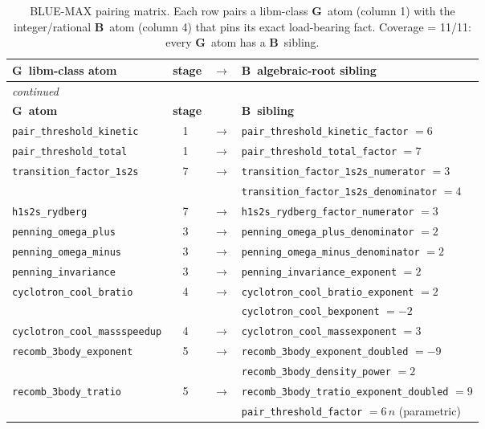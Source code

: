 \documentclass[11pt,a4paper]{article}
\newcommand{\tierBlue}{\textbf{B}}
\newcommand{\tierGreen}{\textbf{G}}
\newcommand{\stg}[1]{\textcircled{\scriptsize#1}}
\begin{document}
\begin{longtable}{@{}l c c l@{}}
\caption{BLUE-MAX pairing matrix. Each row pairs a libm-class
\tierGreen\ atom (column 1) with the integer/rational \tierBlue\ atom
(column 4) that pins its exact load-bearing fact. Coverage = 11/11:
every \tierGreen\ atom has a \tierBlue\ sibling.}
\label{tab:matrix}\\
\toprule
\textbf{\tierGreen\ libm-class atom} & \textbf{stage} & $\to$ &
\textbf{\tierBlue\ algebraic-root sibling} \\
\midrule
\endfirsthead
\multicolumn{4}{l}{\small\itshape continued}\\
\toprule
\textbf{\tierGreen\ atom} & \textbf{stage} & & \textbf{\tierBlue\ sibling} \\
\midrule
\endhead
\texttt{pair\_threshold\_kinetic}     & \stg{1} & $\to$ & \texttt{pair\_threshold\_kinetic\_factor} $=6$ \\
\texttt{pair\_threshold\_total}       & \stg{1} & $\to$ & \texttt{pair\_threshold\_total\_factor} $=7$ \\
\texttt{transition\_factor\_1s2s}     & \stg{7} & $\to$ & \texttt{transition\_factor\_1s2s\_numerator} $=3$ \\
                                      &         &       & \texttt{transition\_factor\_1s2s\_denominator} $=4$ \\
\texttt{h1s2s\_rydberg}               & \stg{7} & $\to$ & \texttt{h1s2s\_rydberg\_factor\_numerator} $=3$ \\
\texttt{penning\_omega\_plus}         & \stg{3} & $\to$ & \texttt{penning\_omega\_plus\_denominator} $=2$ \\
\texttt{penning\_omega\_minus}        & \stg{3} & $\to$ & \texttt{penning\_omega\_minus\_denominator} $=2$ \\
\texttt{penning\_invariance}          & \stg{3} & $\to$ & \texttt{penning\_invariance\_exponent} $=2$ \\
\texttt{cyclotron\_cool\_bratio}      & \stg{4} & $\to$ & \texttt{cyclotron\_cool\_bratio\_exponent} $=2$ \\
                                      &         &       & \texttt{cyclotron\_cool\_bexponent} $=-2$ \\
\texttt{cyclotron\_cool\_massspeedup} & \stg{4} & $\to$ & \texttt{cyclotron\_cool\_massexponent} $=3$ \\
\texttt{recomb\_3body\_exponent}      & \stg{5} & $\to$ & \texttt{recomb\_3body\_exponent\_doubled} $=-9$ \\
                                      &         &       & \texttt{recomb\_3body\_density\_power} $=2$ \\
\texttt{recomb\_3body\_tratio}        & \stg{5} & $\to$ & \texttt{recomb\_3body\_tratio\_exponent\_doubled} $=9$ \\
                                      &         &       & \texttt{pair\_threshold\_factor} $=6\,n$ (parametric) \\
\bottomrule
\end{longtable}
\end{document}
